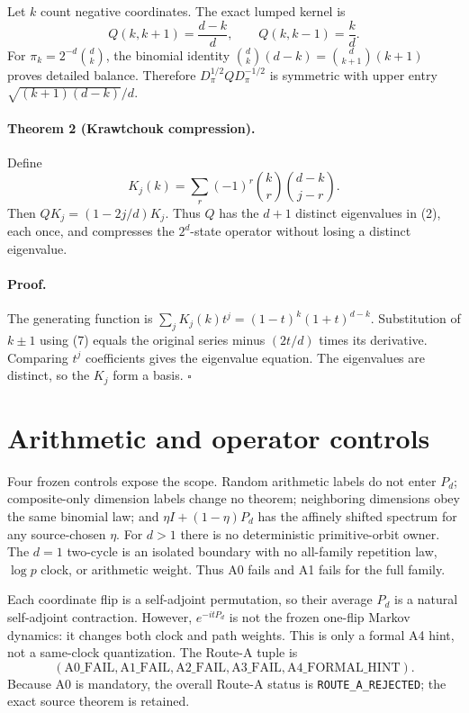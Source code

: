 \documentclass[10pt]{article}
\begin{document}
Let $k$ count negative coordinates.  The exact lumped kernel is
\[
 Q(k,k+1)=\frac{d-k}{d},\qquad Q(k,k-1)=\frac{k}{d}.             \tag{7}
\]
For $\pi_k=2^{-d}\binom dk$, the binomial identity
$\binom dk(d-k)=\binom d{k+1}(k+1)$ proves detailed balance.  Therefore
$D_\pi^{1/2}QD_\pi^{-1/2}$ is symmetric with upper entry
$\sqrt{(k+1)(d-k)}/d$.

\paragraph{Theorem 2 (Krawtchouk compression).}
Define
\[
 K_j(k)=\sum_r(-1)^r\binom kr\binom{d-k}{j-r}.
\]
Then $QK_j=(1-2j/d)K_j$.  Thus $Q$ has the $d+1$ distinct eigenvalues
in (2), each once, and compresses the $2^d$-state operator without losing a
distinct eigenvalue.

\paragraph{Proof.}
The generating function is
$\sum_jK_j(k)t^j=(1-t)^k(1+t)^{d-k}$.  Substitution of $k\pm1$ using (7)
equals the original series minus $(2t/d)$ times its derivative.  Comparing
$t^j$ coefficients gives the eigenvalue equation.  The eigenvalues are
distinct, so the $K_j$ form a basis. \hfill$\square$

\section{Arithmetic and operator controls}
Four frozen controls expose the scope.  Random arithmetic labels do not enter
$P_d$; composite-only dimension labels change no theorem; neighboring
dimensions obey the same binomial law; and $\eta I+(1-\eta)P_d$ has the
affinely shifted spectrum for any source-chosen $\eta$.  For $d>1$ there is no
deterministic primitive-orbit owner.  The $d=1$ two-cycle is an isolated
boundary with no all-family repetition law, $\log p$ clock, or arithmetic
weight.  Thus A0 fails and A1 fails for the full family.

Each coordinate flip is a self-adjoint permutation, so their average $P_d$ is
a natural self-adjoint contraction.  However, $e^{-itP_d}$ is not the frozen
one-flip Markov dynamics: it changes both clock and path weights.  This is only
a formal A4 hint, not a same-clock quantization.  The Route-A tuple is
\[
 (\mathrm{A0\_FAIL},\mathrm{A1\_FAIL},\mathrm{A2\_FAIL},
   \mathrm{A3\_FAIL},\mathrm{A4\_FORMAL\_HINT}).                 \tag{8}
\]
Because A0 is mandatory, the overall Route-A status is
\texttt{ROUTE\_A\_REJECTED}; the exact source theorem is retained.
\end{document}
